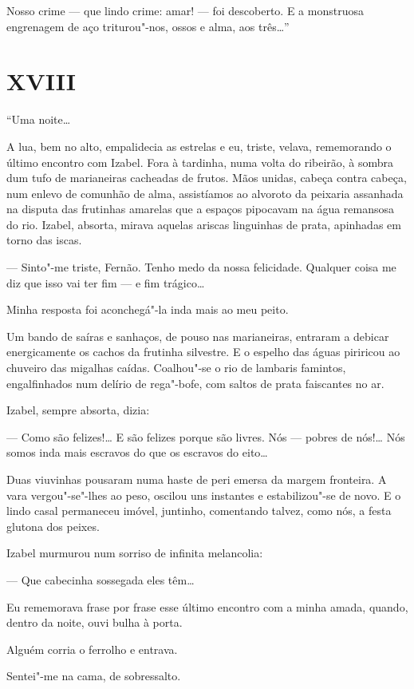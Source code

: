 Nosso crime --- que lindo crime: amar! --- foi descoberto. E a
monstruosa engrenagem de aço triturou"-nos, ossos e alma, aos três\ldots{}''

\section*{XVIII}

``Uma noite\ldots{}

A lua, bem no alto, empalidecia as estrelas e eu, triste, velava,
rememorando o último encontro com Izabel. Fora à tardinha, numa volta do
ribeirão, à sombra dum tufo de marianeiras cacheadas de frutos. Mãos
unidas, cabeça contra cabeça, num enlevo de comunhão de alma,
assistíamos ao alvoroto da peixaria assanhada na disputa das frutinhas
amarelas que a espaços pipocavam na água remansosa do rio. Izabel,
absorta, mirava aquelas ariscas linguinhas de prata, apinhadas em torno
das iscas.

--- Sinto"-me triste, Fernão. Tenho medo da nossa felicidade. Qualquer
coisa me diz que isso vai ter fim --- e fim trágico\ldots{}

Minha resposta foi aconchegá"-la inda mais ao meu peito.

Um bando de saíras e sanhaços, de pouso nas marianeiras, entraram a
debicar energicamente os cachos da frutinha silvestre. E o espelho das
águas piriricou ao chuveiro das migalhas caídas. Coalhou"-se o rio de
lambaris famintos, engalfinhados num delírio de rega"-bofe, com saltos de
prata faiscantes no ar.

Izabel, sempre absorta, dizia:

--- Como são felizes!\ldots{} E são felizes porque são livres. Nós --- pobres
de nós!\ldots{} Nós somos inda mais escravos do que os escravos do eito\ldots{}

Duas viuvinhas pousaram numa haste de peri emersa da margem fronteira. A
vara vergou"-se"-lhes ao peso, oscilou uns instantes e estabilizou"-se de
novo. E o lindo casal permaneceu imóvel, juntinho, comentando talvez,
como nós, a festa glutona dos peixes.

Izabel murmurou num sorriso de infinita melancolia:

--- Que cabecinha sossegada eles têm\ldots{}

Eu rememorava frase por frase esse último encontro com a minha amada,
quando, dentro da noite, ouvi bulha à porta.

Alguém corria o ferrolho e entrava.

Sentei"-me na cama, de sobressalto.

